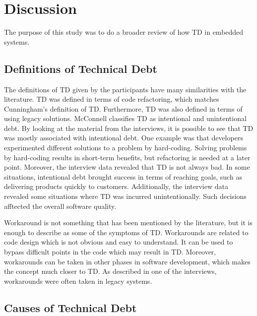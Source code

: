 \chapter{Discussion}
The purpose of this study was to do a broader review of how TD in embedded systems.





\section{Definitions of Technical Debt}
The definitions of TD given by the participants have many similarities with the literature. TD was defined in terms of code refactoring, which matches Cunningham's definition of TD\cite{p29-cunningham}. Furthermore, TD was also defined in terms of using legacy solutions. McConnell classifies TD as intentional and unintentional debt\cite{url-mcconnell}. By looking at the material from the interviews, it is possible to see that TD was mostly associated with intentional debt. One example was that developers experimented different solutions to a problem by hard-coding. Solving problems by hard-coding results in short-term benefits, but refactoring is needed at a later point. Moreover, the interview data revealed that TD is not always bad. In some situations, intentional debt brought success in terms of reaching goals, such as delivering products quickly to customers. Additionally, the interview data revealed some situations where TD was incurred unintentionally. Such decisions afftected the overall software quality.

Workaround is not something that has been mentioned by the literature, but it is enough to describe as some of the symptoms of TD. Workarounds are related to code design which is not obvious and easy to understand. It can be used to bypass difficult points in the code which may result in TD. Moreover, workarounds can be taken in other phases in software development, which makes the concept much closer to TD. As described in one of the interviews, workarounds were often taken in legacy systems.

\section{Causes of Technical Debt}

